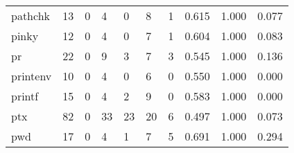 \begin{longtable}{lp{2.0cm}p{2.0cm}p{2.0cm}p{2.0cm}p{2.0cm}p{2.0cm}p{2.0cm}p{2.0cm}p{2.0cm}}
pathchk   &                     13 &                                             0 &                                            4 &                                           0 &                                            8 &                                          1 &                                0.615 &                                  1.000 &                                0.077 \\
pinky     &                     12 &                                             0 &                                            4 &                                           0 &                                            7 &                                          1 &                                0.604 &                                  1.000 &                                0.083 \\
pr        &                     22 &                                             0 &                                            9 &                                           3 &                                            7 &                                          3 &                                0.545 &                                  1.000 &                                0.136 \\
printenv  &                     10 &                                             0 &                                            4 &                                           0 &                                            6 &                                          0 &                                0.550 &                                  1.000 &                                0.000 \\
printf    &                     15 &                                             0 &                                            4 &                                           2 &                                            9 &                                          0 &                                0.583 &                                  1.000 &                                0.000 \\
ptx       &                     82 &                                             0 &                                           33 &                                          23 &                                           20 &                                          6 &                                0.497 &                                  1.000 &                                0.073 \\
pwd       &                     17 &                                             0 &                                            4 &                                           1 &                                            7 &                                          5 &                                0.691 &                                  1.000 &                                0.294 \\

\end{longtable}
